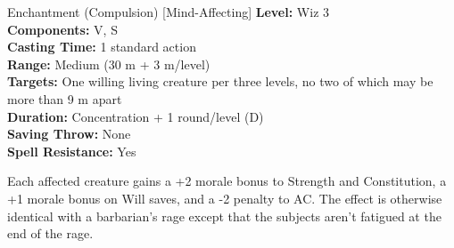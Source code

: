 {Enchantment (Compulsion) [Mind-Affecting]}
{
	\textbf{Level:}
	Wiz 3\\
	\textbf{Components:}
	V, S\\
	\textbf{Casting Time:}
	1 standard action\\
	\textbf{Range:}
	Medium (30 m + 3 m/level)\\
	\textbf{Targets:}
	One willing living creature per three levels, no two of which may be more than 9 m apart\\
	\textbf{Duration:}
	Concentration + 1 round/level (D)\\
	\textbf{Saving Throw:}
	None\\
	\textbf{Spell Resistance:}
	Yes\\
}
{
	Each affected creature gains a +2 morale bonus to Strength and Constitution, a +1 morale bonus on Will saves, and a -2 penalty to AC. The effect is otherwise identical with a barbarian's rage except that the subjects aren't fatigued at the end of the rage.

}

